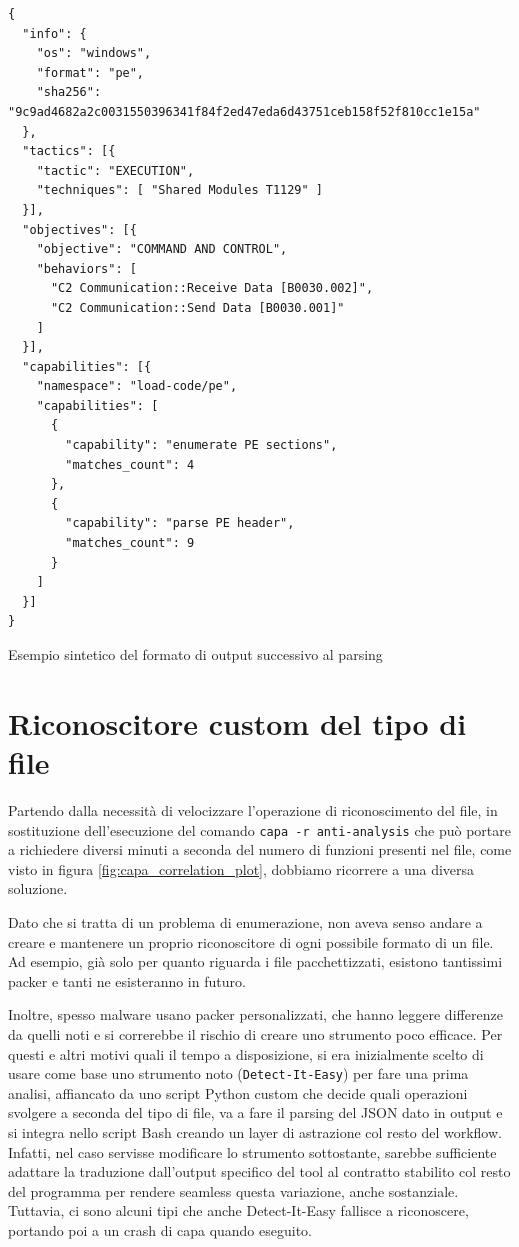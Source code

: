 \begin{code}
\begin{verbatim}
{
  "info": {
    "os": "windows",
    "format": "pe",
    "sha256": "9c9ad4682a2c0031550396341f84f2ed47eda6d43751ceb158f52f810cc1e15a"
  },
  "tactics": [{
    "tactic": "EXECUTION",
    "techniques": [ "Shared Modules T1129" ]
  }],
  "objectives": [{
    "objective": "COMMAND AND CONTROL",
    "behaviors": [
      "C2 Communication::Receive Data [B0030.002]",
      "C2 Communication::Send Data [B0030.001]"
    ]
  }],
  "capabilities": [{
    "namespace": "load-code/pe",
    "capabilities": [
      {
        "capability": "enumerate PE sections",
        "matches_count": 4
      },
      {
        "capability": "parse PE header",
        "matches_count": 9
      }
    ]
  }]
}
\end{verbatim}
\caption{Esempio sintetico del formato di output successivo al parsing}
\end{code}

\section{Riconoscitore custom del tipo di file}
\label{chap:static_custom_file_detector}
Partendo dalla necessità di velocizzare l'operazione di riconoscimento del file, in sostituzione dell'esecuzione del comando \texttt{capa -r anti-analysis} che può portare a richiedere diversi minuti a seconda del numero di funzioni presenti nel file, come visto in figura \ref{fig:capa_correlation_plot},
dobbiamo ricorrere a una diversa soluzione.

Dato che si tratta di un problema di enumerazione, non aveva senso andare a creare e mantenere un proprio riconoscitore di ogni possibile formato di un file. Ad esempio, già solo per quanto riguarda i file pacchettizzati, esistono tantissimi packer e tanti ne esisteranno in futuro.

Inoltre, spesso malware usano packer personalizzati, che hanno leggere differenze da quelli noti e si correrebbe il rischio di creare uno strumento poco efficace.
Per questi e altri motivi quali il tempo a disposizione, si era inizialmente scelto di usare come base uno strumento noto (\texttt{Detect-It-Easy}) per fare una prima analisi, affiancato da uno script Python custom che decide quali operazioni svolgere a seconda del tipo di file, va a fare il parsing del JSON dato in output e si integra nello script Bash creando un layer di astrazione col resto del workflow.
Infatti, nel caso servisse modificare lo strumento sottostante, sarebbe sufficiente adattare la traduzione dall'output specifico del tool al contratto stabilito col resto del programma per rendere seamless questa variazione, anche sostanziale.
Tuttavia, ci sono alcuni tipi che anche Detect-It-Easy fallisce a riconoscere, portando poi a un crash di capa quando eseguito.

